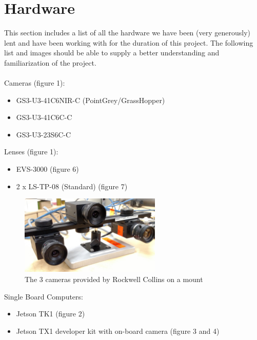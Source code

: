 \documentclass[letterpaper,10pt,titlepage]{IEEEtran}
\begin{document}
\section{Hardware}
   This section includes a list of all the hardware we have been (very generously) lent and have been working with for the duration of this project. The following list and images should be able to supply a better understanding and familiarization of the project.\\
	\\Cameras (figure 1):  
    		\begin{itemize}
		\item GS3-U3-41C6NIR-C (PointGrey/GrassHopper)
		\item GS3-U3-41C6C-C
		\item GS3-U3-23S6C-C\\
		\end{itemize}
	Lenses (figure 1): 
		\begin{itemize}
		\item EVS-3000 (figure 6)
		\item 2 x LS-TP-08 (Standard) (figure 7)\\
		\end{itemize}
		
\begin{figure}[!ht]
  \caption{The 3 cameras provided by Rockwell Collins on a mount}
	  \centering
		    \includegraphics[width=0.6\textwidth,natwidth=610,natheight=642]{images/IMG_20160210_131527329.jpg}
				\end{figure}
				
	Single Board Computers: 
		\begin{itemize}
		\item Jetson TK1 (figure 2) 
		\item Jetson TX1 developer kit with on-board camera (figure 3 and 4)\\
		\end{itemize}
 
\end{document}
